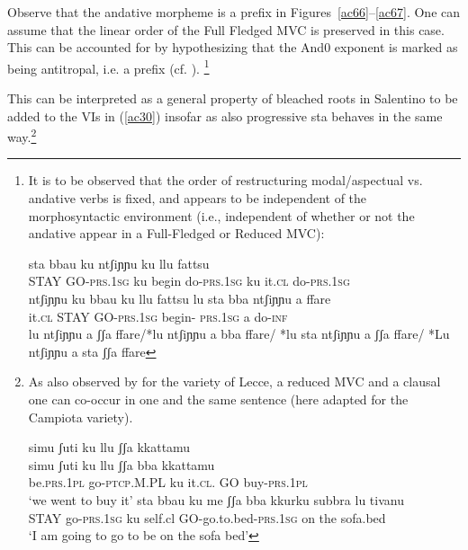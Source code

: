 \documentclass[output=paper]{langscibook}
\begin{document}
Observe that the andative morpheme is a prefix in Figures~\ref{ac66}--\ref{ac67}.  One can assume that the linear order of the Full Fledged MVC is preserved in this case.  This can be accounted for by hypothesizing that the And0 exponent is marked as being antitropal, i.e. a prefix (cf. \cite{bye2012a}).
\footnote{It is to be observed that the order of restructuring modal/aspectual vs. andative verbs is fixed, and appears to be independent of the morphosyntactic environment (i.e., independent of whether or not the andative appear in a Full-Fledged or Reduced MVC):

\ea \label{fn32ex}
    \ea \label{fn32exa}\gll sta bbau   ku ntʃiɲɲu   ku llu  fattsu\\
STAY GO-\textsc{prs}.\textsc{1sg} ku  begin do-\textsc{prs}.\textsc{1sg}  ku it.\textsc{cl} do-\textsc{prs}.\textsc{1sg}\\
\glt *ntʃiɲɲu ku bbau ku llu fattsu
    \ex \label{fn32exb}\gll lu  sta  bba   ntʃiɲɲu      a   ffare\\
it.\textsc{cl}  STAY GO-\textsc{prs}.\textsc{1sg} begin- \textsc{prs}.\textsc{1sg}  a   do-\textsc{inf}\\
\glt *lu ntʃiɲɲu a ʃʃa ffare/*lu ntʃiɲɲu a bba ffare/ *lu sta ntʃiɲɲu a ʃʃa ffare/ *Lu  ntʃiɲɲu a sta ʃʃa ffare
    \z
\z

}

This can be interpreted as a general property of bleached roots in Salentino to be added to the VIs in (\ref{ac30}) insofar as also progressive sta behaves in the same way.\footnote{As also observed by \cite{ledgeway2016a} for the variety of Lecce, a reduced MVC and a clausal one can co-occur in one and the same sentence (here adapted for the Campiota variety).

\ea \label{fn33ex}
    \ea \label{fn33exa}\glll simu      ʃuti        ku   llu     ʃʃa {} kkattamu\\
  simu      ʃuti       ku   llu    ʃʃa  bba kkattamu\\
  be.\textsc{prs}.\textsc{1pl} go-\textsc{ptcp}.M.PL  ku   it.\textsc{cl}.    GO  buy-\textsc{prs}.\textsc{1pl}\\
\glt  ‘we went to buy it’
    \ex \label{fn33exb}
    \gll sta   bbau                         ku  me       {ʃʃa bba           kkurku}      subbra lu tivanu\\
         STAY  go-\textsc{prs}.\textsc{1sg} ku  self.cl  GO-go.to.bed-\textsc{prs}.\textsc{1sg} on  the sofa.bed\\
    \glt ‘I am going to go to be on the sofa bed’
    \z
\z}
\end{document}
